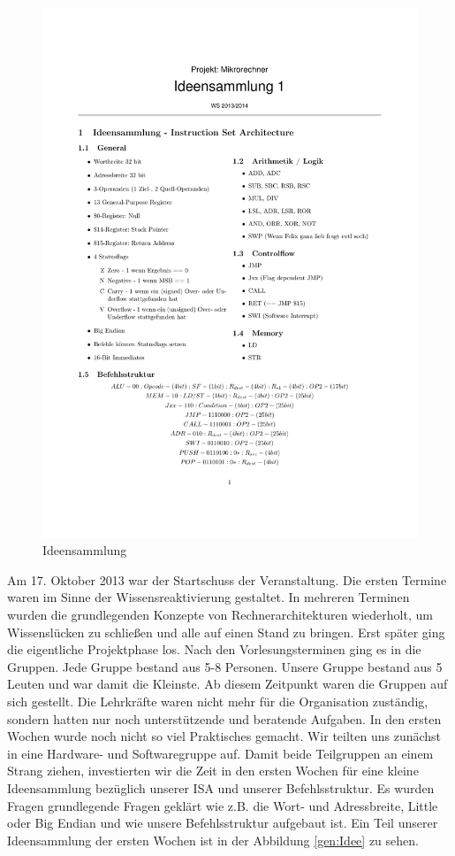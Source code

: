 \begin{figure}
\vspace{-4.5em}
\includegraphics[width=.5\textwidth]{images/Ideensammlung.pdf}
\vspace{-4.5em}
\caption{\label{gen:Idee} Ideensammlung}
\end{figure}
Am 17. Oktober 2013 war der Startschuss der Veranstaltung. Die ersten Termine waren im Sinne der Wissensreaktivierung gestaltet. In mehreren Terminen wurden die grundlegenden Konzepte 
von Rechnerarchitekturen wiederholt, um Wissenslücken zu schließen und alle auf einen Stand zu bringen. Erst später ging die eigentliche Projektphase los.
Nach den Vorlesungsterminen ging es in die Gruppen. Jede Gruppe bestand aus 5-8 Personen. Unsere Gruppe bestand aus 5 Leuten und war damit die Kleinste. Ab diesem Zeitpunkt waren die Gruppen auf sich gestellt. Die Lehrkräfte waren nicht mehr für die Organisation zuständig, sondern hatten nur noch unterstützende und beratende Aufgaben.
In den ersten Wochen wurde noch nicht so viel Praktisches gemacht. Wir teilten uns zunächst in eine Hardware- und Softwaregruppe auf. Damit beide Teilgruppen an einem Strang ziehen, investierten wir die Zeit in den ersten Wochen für eine kleine Ideensammlung bezüglich unserer ISA und unserer Befehlsstruktur. %
Es wurden Fragen grundlegende Fragen geklärt wie z.B. die Wort- und Adressbreite, Little oder Big Endian und wie unsere Befehlsstruktur aufgebaut ist. Ein Teil unserer Ideensammlung der ersten Wochen ist in der Abbildung \autoref{gen:Idee} zu sehen.

